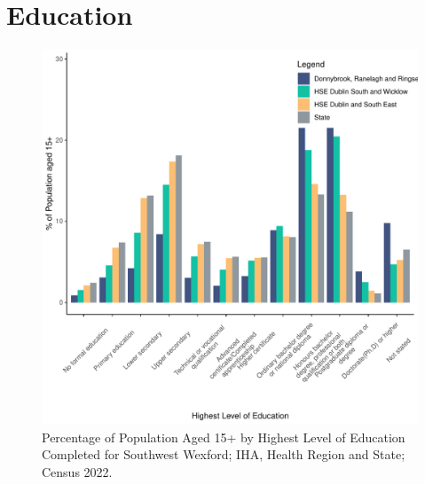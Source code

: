 \documentclass{article}
\begin{document}
\section{Education}\label{sect:Edu}
\begin{figure}[H]
	\centering
	\includegraphics[width = 120mm]{../figures/EduED.pdf}
	\caption{Percentage of Population Aged 15+ by Highest Level of Education Completed for Southwest Wexford; IHA, Health Region and State; Census 2022.}
	\label{fig:vbnv}
	\end{figure}
\end{document}
